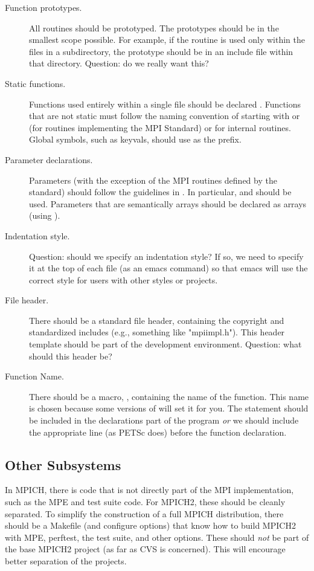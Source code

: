 \documentclass{article}
\begin{document}
\begin{description}
\item[Function prototypes.]
All routines should be prototyped.  The prototypes should be in the
smallest scope possible.  For example, if the routine is used only
within the files in a subdirectory, the prototype should be in an
include file within that directory.
Question: do we really want this?

\item[Static functions.]
Functions used entirely within a single file should be declared
.  Functions that are not static must follow the naming
convention of starting with  or  (for routines
implementing the MPI Standard) or  for internal routines.  
Global symbols, such as keyvals, should use  as the
prefix.  

\item[Parameter declarations.]
Parameters (with the exception of the MPI routines defined by the
standard) should follow the guidelines in .  In
particular,  and  should be used.
Parameters that are semantically arrays should be declared as arrays
(using \code{[]}).  

\item[Indentation style.]
Question: should we specify an indentation style?  If so, we need to
specify it at the top of each file (as an emacs command) so that emacs
will use the correct style for users with other styles or projects.

\item[File header.]
There should be a standard file header, containing the copyright and
standardized includes (e.g., something like "mpiimpl.h").  This header
template should be part of the development environment.  Question:
what should this header be?

\item[Function Name.]
There should be a macro, , containing the name of the
function.  This name is chosen because some versions of  will set it
for you.  The statement  should be included
in the declarations part of the program \emph{or} we should include the
appropriate  line (as PETSc does) before the function
declaration. 
\end{description}

\subsection{Other Subsystems}
In MPICH, there is code that is not directly part of the MPI
implementation, such as the MPE and test suite code.  For MPICH2,
these should be cleanly separated.  To simplify the construction of a
full MPICH distribution, there should be a Makefile (and configure
options) that know how to build MPICH2 with MPE, perftest, the test
suite, and other options.  These should \emph{not} be part of the base
MPICH2 project (as far as CVS is concerned).  This will encourage
better separation of the projects.
\end{document}
